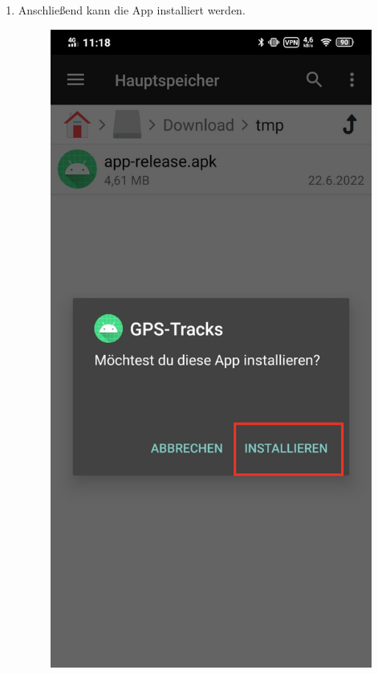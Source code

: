 \documentclass{article}
\begin{document}
\begin{enumerate}
    \item Anschließend kann die App installiert werden.

        \begin{minipage}{0.5\textwidth}
        \begin{figure}[H]
            \includegraphics[scale=0.81]{18.jpg}
            \centering
        \end{figure}
        

\end{minipage}
\end{enumerate}
\end{document}
